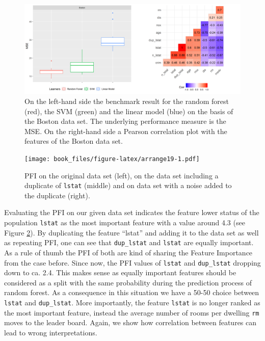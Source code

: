 \documentclass[
]{krantz}
\begin{document}
\begin{figure}
\includegraphics[width=1\linewidth]{images/bmreal} \caption{On the left-hand side the benchmark result for the random forest (red), the SVM (green) and the linear model (blue) on the basis of the Boston data set. The underlying performance measure is the MSE. On the right-hand side a Pearson correlation plot with the features of the Boston data set.}\label{fig:bmrBoston}
\end{figure}

\begin{figure}
\centering
\texttt{[image: book\_files/figure-latex/arrange19-1.pdf]}
\caption{\label{fig:arrange19}PFI on the original data set (left), on the data set including a duplicate of \texttt{lstat} (middle) and on data set with a noise added to the duplicate (right).}
\end{figure}

Evaluating the PFI on our given data set indicates the feature lower status of the population \texttt{lstat} as the most important feature with a value around 4.3 (see Figure \ref{fig:arrange19}). By duplicating the feature ``lstat'' and adding it to the data set as well as repeating PFI, one can see that \texttt{dup\_lstat} and \texttt{lstat} are equally important. As a rule of thumb the PFI of both are kind of sharing the Feature Importance from the case before. Since now, the PFI values of \texttt{lstat} and \texttt{dup\_lstat} dropping down to ca. 2.4. This makes sense as equally important features should be considered as a split with the same probability during the prediction process of random forest. As a consequence in this situation we have a 50-50 choice between \texttt{lstat} and \texttt{dup\_lstat}. More importantly, the feature \texttt{lstat} is no longer ranked as the most important feature, instead the average number of rooms per dwelling \texttt{rm} moves to the leader board. Again, we show how correlation between features can lead to wrong interpretations.
\end{document}
